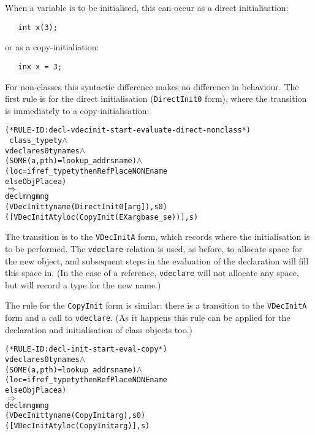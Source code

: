 \documentclass[11pt]{article}
\begin{document}
When a variable is to be initialised, this can occur as a direct
initialisation:
\begin{verbatim}
   int x(3);
\end{verbatim}
or as a copy-initialiation:
\begin{verbatim}
   inx x = 3;
\end{verbatim}
%
For non-classes this syntactic difference makes no difference in
behaviour.  The first rule is for the direct initialisation
(\texttt{DirectInit0} form), where the transition is immediately to a
copy-initialisation:
\begin{center}
\begin{minipage}{\textwidth}
\begin{alltt}
(* RULE-ID: decl-vdecinit-start-evaluate-direct-nonclass *)
     ~class_type ty \(\land\)
     vdeclare s0 ty name s \(\land\)
     (SOME (a,pth) = lookup_addr s name) \(\land\)
     (loc = if ref_type ty then RefPlace NONE name
            else ObjPlace a)
   \(\Rightarrow\)
     declmng mng
             (VDecInit ty name (DirectInit0 [arg]), s0)
             ([VDecInitA ty loc (CopyInit (EX arg base_se))], s)
\end{alltt}
\end{minipage}
\end{center}
%
%
The transition is to the \texttt{VDecInitA} form, which records where
the initialisation is to be performed.  The \texttt{vdeclare} relation
is used, as before, to allocate space for the new object, and
subsequent steps in the evaluation of the declaration will fill this
space in.  (In the case of a reference, \texttt{vdeclare} will not
allocate any space, but will record a type for the new name.)

%
The rule for the \texttt{CopyInit} form is similar: there is a
transition to the \texttt{VDecInitA} form and a call to
\texttt{vdeclare}. (As it happens this rule can be applied for the
declaration and initialisation of class objects too.)
\begin{center}
\begin{minipage}{\textwidth}
%
\begin{alltt}
(* RULE-ID: decl-init-start-eval-copy *)
     vdeclare s0 ty name s \(\land\)
     (SOME (a,pth) = lookup_addr s name) \(\land\)
     (loc = if ref_type ty then RefPlace NONE name
            else ObjPlace a)
   \(\Rightarrow\)
     declmng mng
             (VDecInit ty name (CopyInit arg), s0)
             ([VDecInitA ty loc (CopyInit arg)], s)
\end{alltt}
\end{minipage}
\end{center}
\end{document}
